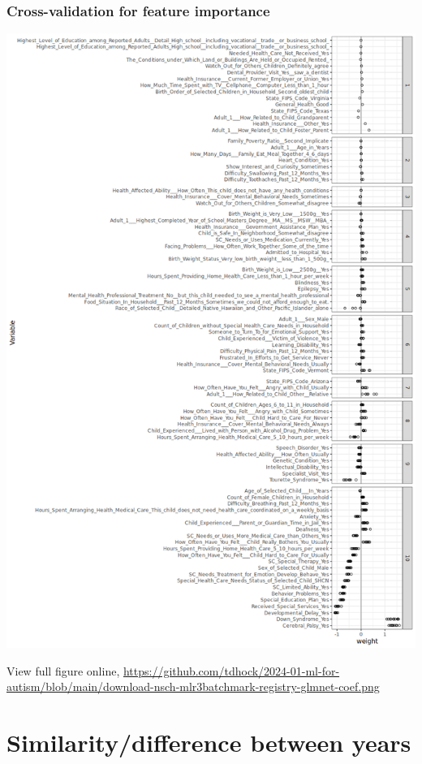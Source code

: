 \documentclass{beamer}
\begin{document}
\begin{frame}
  \frametitle{Cross-validation for feature importance}
  \includegraphics[height=0.7\textheight]{download-nsch-mlr3batchmark-registry-glmnet-coef.png}

  View full figure online, \url{https://github.com/tdhock/2024-01-ml-for-autism/blob/main/download-nsch-mlr3batchmark-registry-glmnet-coef.png}
\end{frame}

\section{Similarity/difference between years}
\end{document}
